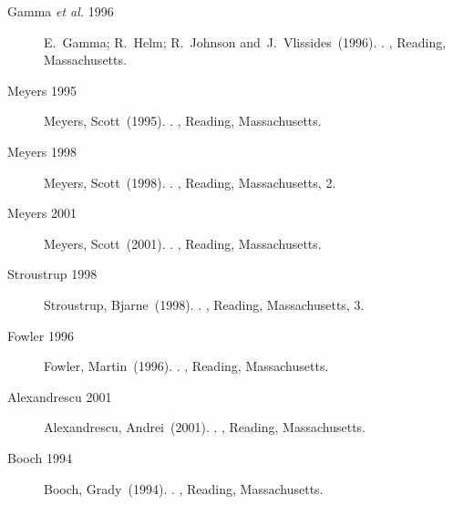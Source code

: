 \begin{description}

\item[Gamma {\em et al.} 1996]
{\sc E.~Gamma}; {\sc R.~Helm}; {\sc R.~Johnson} and{}\ {\sc J.~Vlissides}\ (1996).
.
, Reading, Massachusetts.

\item[Meyers 1995]
{\sc Meyers, Scott}\ (1995).
.
, Reading, Massachusetts.

\item[Meyers 1998]
{\sc Meyers, Scott}\ (1998).
.
, Reading, Massachusetts, 2.

\item[Meyers 2001]
{\sc Meyers, Scott}\ (2001).
.
, Reading, Massachusetts.



\item[Stroustrup 1998]
{\sc Stroustrup, Bjarne}\ (1998).
.
, Reading, Massachusetts, 3.

\item[Fowler 1996]
{\sc Fowler, Martin}\ (1996).
.
, Reading, Massachusetts.


\item[Alexandrescu 2001]
{\sc Alexandrescu, Andrei}\ (2001).
.
, Reading, Massachusetts.

\item[Booch 1994]
{\sc Booch, Grady}\ (1994).
.
, Reading, Massachusetts.

\end{description}

